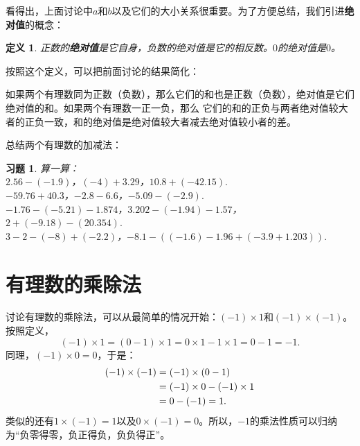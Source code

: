 \documentclass[12pt,UTF8]{ctexbook}
\newtheorem{df}{定义}[section]
\newtheorem{xt}{习题}[section]
\begin{document}
看得出，上面讨论中$a$和$b$以及它们的大小关系很重要。为了方便总结，我们引进\textbf{绝对值}的概念：
\begin{df}\label{df:3-0-0}
    正数的\textbf{绝对值}是它自身，负数的绝对值是它的相反数。$0$的绝对值是$0$。
\end{df}
按照这个定义，可以把前面讨论的结果简化：

如果两个有理数同为正数（负数），那么它们的和也是正数（负数），绝对值是它们绝对值的和。如果两个有理数一正一负，那么
它们的和的正负与两者绝对值较大者的正负一致，和的绝对值是绝对值较大者减去绝对值较小者的差。

总结两个有理数的加减法：
\begin{center}
\end{center}

\begin{xt}\label{xt:3-0-0}
    算一算：\\
    \indent $2.56 - (-1.9)$，$(-4) + 3.29$，$10.8 + (-42.15).$ \\
    \indent $-59.76 + 40.3$，$-2.8 - 6.6$，$-5.09 - (-2.9).$ \\
    \indent $-1.76 -(-5.21) - 1.874$，$3.202 - (-1.94) - 1.57$，$2 + (-9.18) - (20.354).$ \\
    \indent $3 - 2 - (-8) + (-2.2)$，$-8.1 - ((-1.6) - 1.96 + (-3.9 + 1.203)).$
\end{xt}

\section{有理数的乘除法}
讨论有理数的乘除法，可以从最简单的情况开始：$(-1) \times 1$和$(-1) \times (-1)$。按照定义，
$$(-1) \times 1 = (0 - 1) \times 1 = 0 \times 1 - 1 \times 1 = 0 - 1 = -1.$$
同理，$(-1) \times 0 = 0$，于是：
\begin{align}
    (-1) \times (-1) &= (-1) \times (0 - 1) \notag \\
    &= (-1) \times 0 - (-1) \times 1 \notag \\
    &= 0 - (-1) = 1. \notag
\end{align}
类似的还有$1 \times (-1) = 1$以及$0 \times (-1) = 0$。所以，$-1$的乘法性质可以归纳为“负零得零，负正得负，负负得正”。
\end{document}
